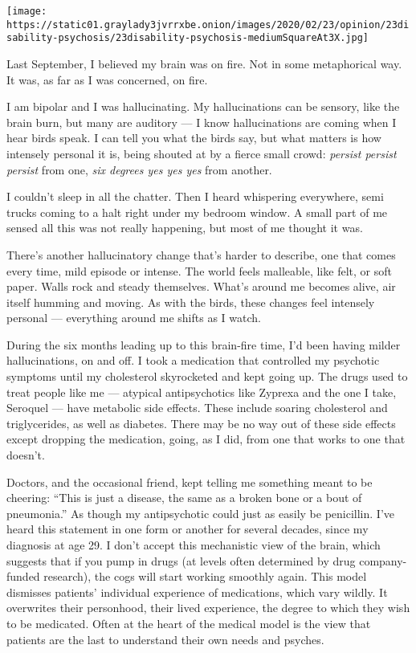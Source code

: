 \texttt{[image: https://static01.graylady3jvrrxbe.onion/images/2020/02/23/opinion/23disability-psychosis/23disability-psychosis-mediumSquareAt3X.jpg]}

Last September, I believed my brain was on fire. Not in some
metaphorical way. It was, as far as I was concerned, on fire.

I am bipolar and I was hallucinating. My hallucinations can be sensory,
like the brain burn, but many are auditory --- I know hallucinations are
coming when I hear birds speak. I can tell you what the birds say, but
what matters is how intensely personal it is, being shouted at by a
fierce small crowd: \emph{persist persist persist} from one, \emph{six
degrees yes yes yes} from another.

I couldn't sleep in all the chatter. Then I heard whispering everywhere,
semi trucks coming to a halt right under my bedroom window. A small part
of me sensed all this was not really happening, but most of me thought
it was.

There's another hallucinatory change that's harder to describe, one that
comes every time, mild episode or intense. The world feels malleable,
like felt, or soft paper. Walls rock and steady themselves. What's
around me becomes alive, air itself humming and moving. As with the
birds, these changes feel intensely personal --- everything around me
shifts as I watch.

During the six months leading up to this brain-fire time, I'd been
having milder hallucinations, on and off. I took a medication that
controlled my psychotic symptoms until my cholesterol skyrocketed and
kept going up. The drugs used to treat people like me --- atypical
antipsychotics like Zyprexa and the one I take, Seroquel --- have
metabolic side effects. These include soaring cholesterol and
triglycerides, as well as diabetes. There may be no way out of these
side effects except dropping the medication, going, as I did, from one
that works to one that doesn't.

Doctors, and the occasional friend, kept telling me something meant to
be cheering: ``This is just a disease, the same as a broken bone or a
bout of pneumonia.'' As though my antipsychotic could just as easily be
penicillin. I've heard this statement in one form or another for several
decades, since my diagnosis at age 29. I don't accept this mechanistic
view of the brain, which suggests that if you pump in drugs (at levels
often determined by drug company-funded research), the cogs will start
working smoothly again. This model dismisses patients' individual
experience of medications, which vary wildly. It overwrites their
personhood, their lived experience, the degree to which they wish to be
medicated. Often at the heart of the medical model is the view that
patients are the last to understand their own needs and psyches.

